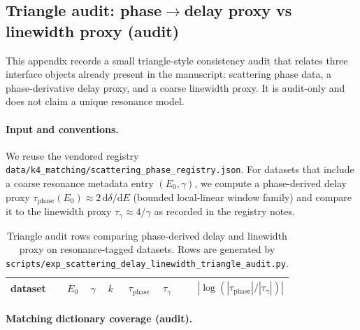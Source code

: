 \subsection{Triangle audit: phase$\to$delay proxy vs linewidth proxy (audit)}
\label{app:scattering_delay_linewidth_triangle_audit}

This appendix records a small triangle-style consistency audit that relates three interface objects already present in the manuscript:
scattering phase data, a phase-derivative delay proxy, and a coarse linewidth proxy.
It is audit-only and does not claim a unique resonance model.

\paragraph{Input and conventions.}
\AuditTag We reuse the vendored registry \texttt{data/k4\_matching/scattering\_phase\_registry.json}.
For datasets that include a coarse resonance metadata entry $(E_0,\gamma)$, we compute a phase-derived delay proxy
$\tau_{\mathrm{phase}}(E_0)\approx 2\,\mathrm{d}\delta/\mathrm{d}E$ (bounded local-linear window family) and compare it to the linewidth proxy $\tau_\gamma\approx 4/\gamma$ as recorded in the registry notes.

\AuditTag %

\begin{table}[H]
\centering
\small
\setlength{\tabcolsep}{8pt}
\renewcommand{\arraystretch}{1.15}
\begin{tabular}{lrrrrrr}
\toprule
dataset & $E_0$ & $\gamma$ & $k$ & $\tau_{\mathrm{phase}}$ & $\tau_\gamma$ & $|\log(|\tau_{\mathrm{phase}}|/|\tau_\gamma|)|$ \\
\midrule
%
\end{tabular}
\caption{Triangle audit rows comparing phase-derived delay and linewidth proxy on resonance-tagged datasets. Rows are generated by \texttt{scripts/exp\_scattering\_delay\_linewidth\_triangle\_audit.py}.}
\label{tab:scattering_delay_linewidth_triangle_audit}
\end{table}

\paragraph{Matching dictionary coverage (audit).}
\AuditTag %

